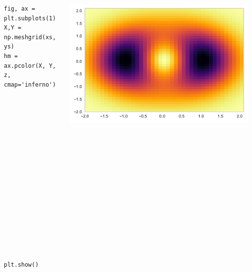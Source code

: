 \documentclass{beamer}
\begin{document}
\begin{frame}[fragile]
\tiny{
\begin{columns}
\begin{column}{0.45\textwidth}
\begin{verbatim}
fig, ax = plt.subplots(1)
X,Y = np.meshgrid(xs, ys)
hm = ax.pcolor(X, Y, z, cmap='inferno')


















plt.show()
\end{verbatim}
\end{column}
\begin{column}{0.55\textwidth}
\includegraphics[width=\textwidth]{../heatmap_3.pdf}
\end{column}
\end{columns}
}
\end{frame}
\end{document}
